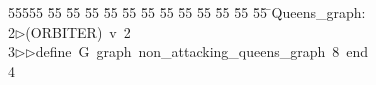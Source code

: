 %
%
\begin{tabbing}
55555 \= 55 \= 55 \= 55 \= 55 \= 55 \= 55 \= 55 \= 55 \= 55 \= 55 \= 55 \= 55 \= \>Queens\_graph:\\[0pt]
2\>$\triangleright$\>(ORBITER)\ v\ 2\ \\[0pt]
3\>$\triangleright$\>$\triangleright$\>define\ G\ graph\ non\_attacking\_queens\_graph\ 8\ end\ \\[0pt]
4\>\end{tabbing}
